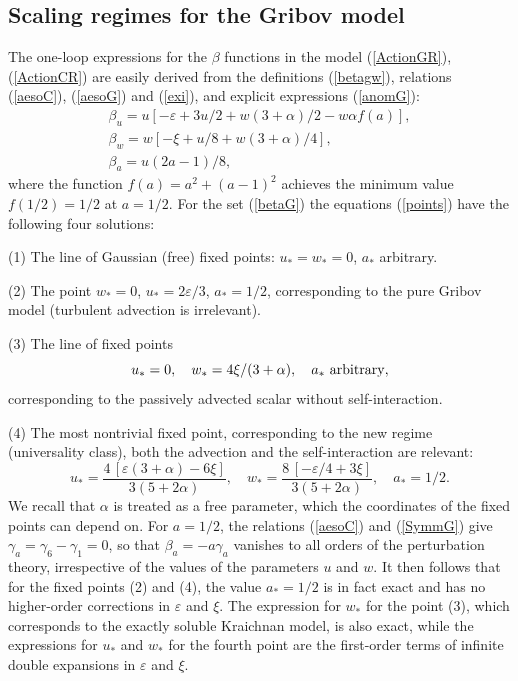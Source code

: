 \documentclass[12pt]{article}
\begin{document}
\subsection{Scaling regimes for the Gribov model} \label{sec:GPS}

The one-loop expressions for the $\beta$ functions in the model
(\ref{ActionGR}), (\ref{ActionCR}) are easily derived from the definitions
(\ref{betagw}), relations (\ref{aesoC}), (\ref{aesoG}) and (\ref{exi}),
and explicit expressions (\ref{anomG}):
\begin{eqnarray}
\beta_{u} = u \left[ -\varepsilon+ 3u/2 + w(3+\alpha)/2 -w\alpha f(a) \right],
\nonumber \\
\beta_{w} = w \left[ -\xi +u/8 + w(3+\alpha)/4 \right],
\nonumber \\
\beta_{a} = u(2a-1)/8,
\label{betaG}
\end{eqnarray}
where the function $f(a)=a^{2}+(a-1)^{2}$ achieves the minimum value
$f(1/2) =1/2$ at $a=1/2$. For the set (\ref{betaG}) the equations
(\ref{points}) have the following four solutions:

(1) The line of Gaussian (free) fixed points: $u_{*}=w_{*}=0$, $a_{*}$
arbitrary.

(2) The point $w_{*}=0$, $u_{*}=2\varepsilon/3$, $a_{*}=1/2$, corresponding
to the pure Gribov model (turbulent advection is irrelevant).

(3) The line of fixed points
\begin{equation}
u_{*}=0, \quad w_{*}=4\xi/(3+\alpha), \quad  a_{*} \ {\rm arbitrary},
\label{line3}
\end{equation}
corresponding to the passively advected scalar without self-interaction.

(4) The most nontrivial fixed point, corresponding to the new regime
(universality class), both the advection and the self-interaction are
relevant:
\begin{equation}
u_{*} = \frac{4\,[\varepsilon(3+\alpha)-6\xi]}{3(5+2\alpha)}, \quad
w_{*} = \frac{8\,[-\varepsilon/4+3\xi]}{3(5+2\alpha)}, \quad a_{*}=1/2.
\label{wu4}
\end{equation}
We recall that $\alpha$ is treated as a free parameter, which the
coordinates of the fixed points can depend on.
For $a=1/2$, the relations (\ref{aesoC}) and (\ref{SymmG}) give
$\gamma_{a} = \gamma_{6}-\gamma_{1}=0$, so that $\beta_{a} =-a \gamma_{a}$
vanishes to all orders of the perturbation theory, irrespective of the
values of the parameters $u$ and $w$. It then follows that for the fixed
points (2) and (4), the value $a_{*}=1/2$ is in fact exact and has no
higher-order corrections in $\varepsilon$ and $\xi$.
The expression for $w_{*}$
for the point (3), which corresponds to the exactly soluble Kraichnan model,
is also exact, while the expressions for $u_{*}$ and $w_{*}$ for the
fourth point are the first-order terms of infinite double expansions
in $\varepsilon$ and $\xi$.
\end{document}
